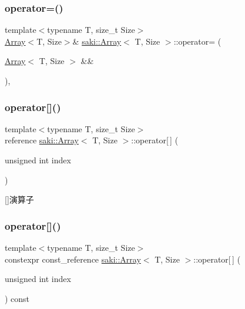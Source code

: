 \subsubsection{\texorpdfstring{operator=()}{operator=()}\hspace{0.1cm}{\footnotesize\ttfamily [2/2]}}
{\footnotesize\ttfamily template$<$typename T, size\+\_\+t Size$>$ \\
\mbox{\hyperlink{classsaki_1_1_array}{Array}}$<$T, Size$>$\& \mbox{\hyperlink{classsaki_1_1_array}{saki\+::\+Array}}$<$ T, Size $>$\+::operator= (\begin{DoxyParamCaption}\item[{\mbox{\hyperlink{classsaki_1_1_array}{Array}}$<$ T, Size $>$ \&\&}]{ }\end{DoxyParamCaption})\hspace{0.3cm}{\ttfamily [default]}, {\ttfamily [noexcept]}}

\mbox{\label{classsaki_1_1_array_a58ffdb4c5484609ccdf0af3fb788fbfe}} 
\subsubsection{\texorpdfstring{operator[]()}{operator[]()}\hspace{0.1cm}{\footnotesize\ttfamily [1/2]}}
{\footnotesize\ttfamily template$<$typename T, size\+\_\+t Size$>$ \\
reference \mbox{\hyperlink{classsaki_1_1_array}{saki\+::\+Array}}$<$ T, Size $>$\+::operator\mbox{[}$\,$\mbox{]} (\begin{DoxyParamCaption}\item[{unsigned int}]{index }\end{DoxyParamCaption})\hspace{0.3cm}{\ttfamily [inline]}}



\mbox{[}\mbox{]}演算子 

\mbox{\label{classsaki_1_1_array_a7ce9f5d7c63be78fb398d0e3afa804ea}} 
\subsubsection{\texorpdfstring{operator[]()}{operator[]()}\hspace{0.1cm}{\footnotesize\ttfamily [2/2]}}
{\footnotesize\ttfamily template$<$typename T, size\+\_\+t Size$>$ \\
constexpr const\+\_\+reference \mbox{\hyperlink{classsaki_1_1_array}{saki\+::\+Array}}$<$ T, Size $>$\+::operator\mbox{[}$\,$\mbox{]} (\begin{DoxyParamCaption}\item[{unsigned int}]{index }\end{DoxyParamCaption}) const\hspace{0.3cm}{\ttfamily [inline]}}



